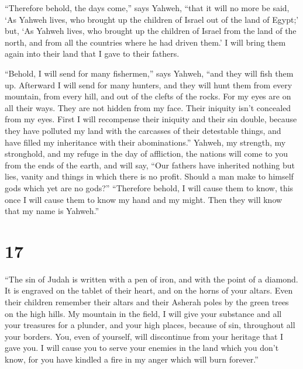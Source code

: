  ``Therefore behold, the days come,'' says Yahweh, ``that
it will no more be said, `As Yahweh lives, who brought up the children
of Israel out of the land of Egypt;'  but, `As Yahweh
lives, who brought up the children of Israel from the land of the north,
and from all the countries where he had driven them.' I will bring them
again into their land that I gave to their fathers.

 ``Behold, I will send for many fishermen,'' says Yahweh,
``and they will fish them up. Afterward I will send for many hunters,
and they will hunt them from every mountain, from every hill, and out of
the clefts of the rocks.  For my eyes are on all their
ways. They are not hidden from my face. Their iniquity isn't concealed
from my eyes.  First I will recompense their iniquity and
their sin double, because they have polluted my land with the carcasses
of their detestable things, and have filled my inheritance with their
abominations.''  Yahweh, my strength, my stronghold, and my
refuge in the day of affliction, the nations will come to you from the
ends of the earth, and will say, ``Our fathers have inherited nothing
but lies, vanity and things in which there is no profit. 
Should a man make to himself gods which yet are no gods?'' 
``Therefore behold, I will cause them to know, this once I will cause
them to know my hand and my might. Then they will know that my name is
Yahweh.''

\hypertarget{section-16}{%
\section{17}\label{section-16}}

 ``The sin of Judah is written with a pen of iron, and with
the point of a diamond. It is engraved on the tablet of their heart, and
on the horns of your altars.  Even their children remember
their altars and their Asherah poles by the green trees on the high
hills.  My mountain in the field, I will give your substance
and all your treasures for a plunder, and your high places, because of
sin, throughout all your borders.  You, even of yourself,
will discontinue from your heritage that I gave you. I will cause you to
serve your enemies in the land which you don't know, for you have
kindled a fire in my anger which will burn forever.''

